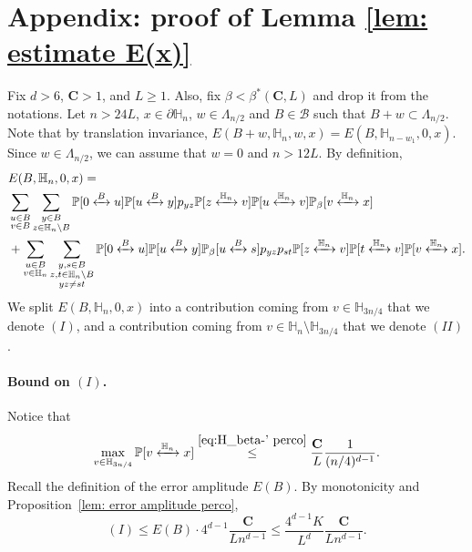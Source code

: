 \documentclass[11pt,a4paper]{article}
\numberwithin{equation}{section}
\theoremstyle{plain}
\theoremstyle{definition}
\newcommand\bfC{\mathbf{C}}
\newcommand{\connect}{\xleftrightarrow}
\begin{document}
\section{Appendix: proof of Lemma \ref{lem: estimate E(x)}}\label{appendix:boundE}
Fix $d>6$, $\bfC>1$, and $L\geq 1$. Also, fix $\beta<\beta^*(\bfC,L)$ and drop it from the notations. Let $n>24L$, $x\in \partial \mathbb H_n$, $w \in \Lambda_{n/2}$ and $B\in \mathcal B$ such that $B+w\subset\Lambda_{n/2}$. Note that by translation invariance, $E(B+w,\mathbb H_n,w,x)=E(B,\mathbb H_{n-w_1},0,x)$. Since $w\in \Lambda_{n/2}$, we can assume that $w=0$ and $n>12L$. By definition,
\begin{align}
	&E(B,\mathbb H_n,0,x)=\notag
	\\&\sum_{\substack{u\in B\\v\in B}}\sum_{\substack{y\in B\\z\in \mathbb H_n\setminus B}}\mathbb P[0\connect{B\:}u]\mathbb P[u\connect{B\:}y]p_{yz}\mathbb P[z\connect{\mathbb H_n\:}v]\mathbb P[u\connect{\mathbb H_n\:}v]\mathbb P_\beta[v\connect{\mathbb H_n\:}x]\notag
	\\&+ \sum_{\substack{u\in B\\v\in \mathbb H_n}}\sum_{\substack{y,s\in B\\ z,t\in \mathbb H_n \setminus B\\ yz\neq st}}\mathbb P[0\connect{B\:}u]\mathbb P[u\connect{B\:}y]\mathbb P_\beta[u\connect{B\:}s]p_{yz}p_{st}\mathbb P[z\connect{\mathbb H_n\:}v]\mathbb P[t\connect{\mathbb H_n\:}v]\mathbb P[v\connect{\mathbb H_n\:}x]\label{eq:proofE(x)1}.
\end{align}
We split $E(B,\mathbb H_n,0,x)$ into a contribution coming from $v\in \mathbb H_{3n/4}$ that we denote $(I)$, and a contribution coming from $v\in \mathbb H_{n}\setminus\mathbb H_{3n/4}$ that we denote $(II)$.
\paragraph{Bound on $(I)$.}
Notice that
\begin{equation}
	\max_{v\in \mathbb H_{3n/4}}\mathbb P[v\connect{\mathbb H_n\:}x]\stackrel{\eqref{eq:H_beta-' perco}}\leq \frac{\bfC}{L}\frac{1}{(n/4)^{d-1}}. 
\end{equation}
Recall the definition of the error amplitude $E(B)$. By monotonicity and Proposition~\ref{lem: error amplitude perco}, 
\begin{equation}
	(I)\leq E(B)\cdot 4^{d-1}\frac{\bfC}{Ln^{d-1}}\leq \frac{4^{d-1}K}{L^d}\frac{\bfC}{Ln^{d-1}}.
\end{equation}
\end{document}
